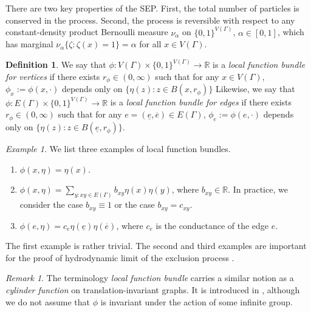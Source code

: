 \documentclass[11pt]{amsart}
\theoremstyle{plain}
\theoremstyle{definition}
\newtheorem{definition}[lemma]{Definition}
\theoremstyle{remark}
\newtheorem{remark}[lemma]{Remark}
\newtheorem{example}[lemma]{Example}
\begin{document}
There are two key properties of the SEP. First, the total number of particles is conserved in the process. Second, the process is reversible with respect to any constant-density product Bernoulli measure $\nu_\alpha$ on $\{0,1\}^{V(\Gamma)}$, $\alpha\in [0,1]$, which has marginal $\nu_\alpha\{\zeta: \zeta(x)=1\}=\alpha
$ for all $x\in V(\Gamma)$. 




\begin{definition}
We say that $\phi: V(\Gamma) \times \{0,1\}^{V(\Gamma)} \to \mathbb{R}$ is a \emph{local function bundle for vertices} if there exists $r_\phi \in (0,\infty)$ such that for any $x\in V(\Gamma)$, $\phi_x :=\phi(x,\cdot)$ depends only on $\{\eta(z): z\in B(x,r_\phi)\}$ Likewise, we say that $\phi: E(\Gamma) \times \{0,1\}^{V(\Gamma)} \to \mathbb{R}$ is a \emph{local function bundle for edges} if there exists $r_\phi\in (0,\infty)$ such that for any $e= (\underline{e},\overline{e}) \in E(\Gamma)$, $\phi_e:= \phi(e,\cdot)$ depends only on $\{\eta(z) : z\in B(\underline{e}, r_\phi)\}$.
\end{definition}

\begin{example}
We list three examples of local function bundles.
\begin{enumerate}
\item $\phi(x,\eta) = \eta(x)$.
\item $\phi(x,\eta) = \sum_{y: xy\in E(\Gamma)} b_{xy} \eta(x)\eta(y)$, where $b_{xy} \in \mathbb{R}$. In practice, we consider the case $b_{xy} \equiv 1$ or the case $b_{xy}= c_{xy}$.
\item $\phi(e,\eta) = c_e \eta(\underline{e})\eta(\overline{e})$, where $c_e$ is the conductance of the edge $e$.
\end{enumerate}
The first example is rather trivial. The second and third examples are important for the proof of hydrodynamic limit of the exclusion process \cite{GPV88, KOV89, KipnisLandim}.
\end{example}

\begin{remark}
The terminology \emph{local function bundle} carries a similar notion as a \emph{cylinder function} on translation-invariant graphs. It is introduced in \cite{Tanaka}, although we do not assume that $\phi$ is invariant under the action of some infinite group. 
\end{remark}
\end{document}
